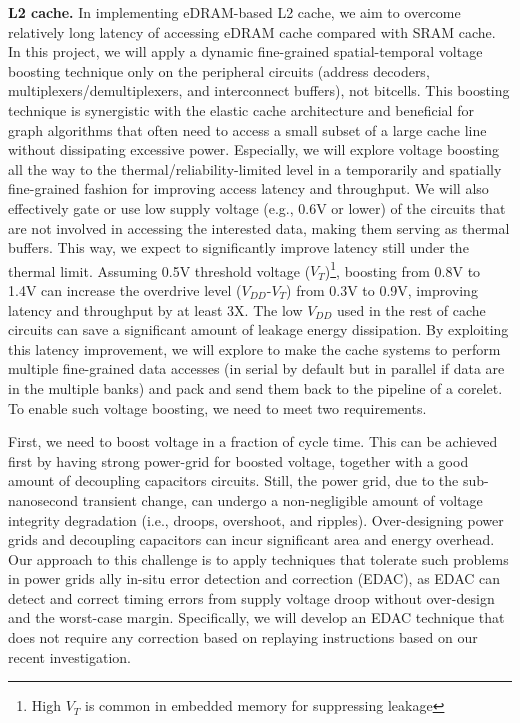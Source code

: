 \vspace{3pt}
\noindent
\textbf{L2 cache.}
In implementing eDRAM-based L2 cache, we aim to %
overcome relatively long latency of accessing eDRAM cache compared with SRAM cache. 
In this project, %
we will apply a dynamic fine-grained spatial-temporal voltage boosting technique only on the peripheral circuits (address decoders, multiplexers/demultiplexers, and interconnect buffers), not bitcells. 
This boosting technique is synergistic with the elastic cache architecture and beneficial for graph algorithms that often need to access a small subset of a large cache line without dissipating excessive power. 
Especially, we will explore voltage boosting all the way to the thermal/reliability-limited level in a temporarily and spatially fine-grained fashion for improving access latency and throughput. 
We will also effectively gate or use low supply voltage (e.g., 0.6V or lower) of the circuits that are not involved in accessing the interested data, making them serving as thermal buffers. 
This way, we expect to significantly improve latency still under the thermal limit. 
Assuming 0.5V threshold voltage ($V_T$)\footnote{High $V_T$ is common in embedded memory for suppressing leakage}, boosting from 0.8V to 1.4V can increase the overdrive level ($V_{DD}$-$V_T$) from 0.3V to 0.9V, improving latency and throughput by at least 3X. 
The low $V_{DD}$ used in the rest of cache circuits can save a significant amount of leakage energy dissipation. 
By exploiting this latency improvement, we will explore to make the cache systems to perform multiple fine-grained data accesses (in serial by default but in parallel if data are in the multiple banks) and pack and send them back to the pipeline of a corelet. 
To enable such voltage boosting, we need to meet two requirements. 


First, we need to boost voltage in a fraction of cycle time. 
This can be achieved first by having strong power-grid for boosted voltage, together with a good amount of decoupling capacitors circuits. 
Still, the power grid, due to the sub-nanosecond transient change, can undergo a non-negligible amount of voltage integrity degradation (i.e., droops, overshoot, and ripples). 
Over-designing power grids and decoupling capacitors can incur significant area and energy overhead. 
Our approach to this challenge is to apply techniques that tolerate such problems in power grids
ally in-situ error detection and correction (EDAC), as EDAC can detect and correct timing errors from supply voltage droop without over-design and the worst-case margin. 
Specifically, we will develop an EDAC technique that does not require any correction based on replaying instructions based on our recent investigation.


